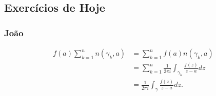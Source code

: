 \documentclass{article}
\begin{document}
 \subsection{Exerc\'icios de Hoje}
 \subsubsection{Jo\~ao}
\begin{align*}
  f(a)\sum\limits_{k=1}^{n}n(\gamma_{k}, a) &= \sum\limits_{k=1}^{n}f(a)n(\gamma_{k}, a) \\
                                            &= \sum\limits_{k=1}^{n}\frac{1}{2\pi i}\int_{\gamma_{k}}^{}\frac{f(z)}{z-a}dz \\
                                            &= \frac{1}{2\pi i}\int_{\gamma}^{}\frac{f(z)}{z-a}dz.
\end{align*}
\end{document}
